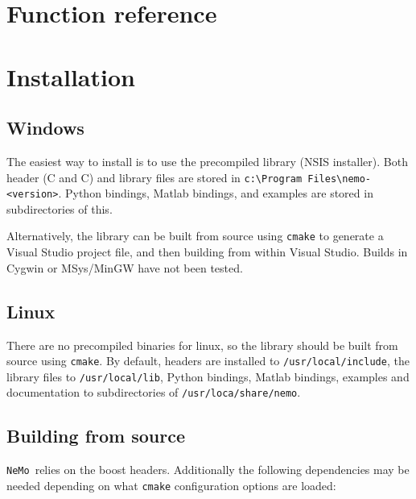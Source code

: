 \documentclass[a4paper]{article}
\newcommand{\nemo}{\texttt{NeMo}}
\newcommand{\command}[1]{\texttt{#1}}
\newcommand{\file}[1]{\texttt{#1}}
\newcommand{\directory}[1]{\texttt{#1}}
\newcommand{\cpp}{C\nolinebreak\hspace{-.05em}\raisebox{.4ex}{\tiny\bf +}\nolinebreak\hspace{-.10em}\raisebox{.4ex}{\tiny\bf +}}
\begin{document}
\newpage
\section{Function reference}
\label{fnref}



\section{Installation}

\subsection{Windows}
\label{installation:windows}

The easiest way to install is to use the precompiled library (NSIS installer).
Both header (C and \cpp) and library files are stored in \directory{c:\textbackslash Program Files\textbackslash nemo-<version>}.
Python bindings, Matlab bindings, and examples are stored in subdirectories of this.

Alternatively, the library can be built from source using \command{cmake} to generate a Visual Studio project file,
	and then building from within Visual Studio.
Builds in Cygwin or MSys/MinGW have not been tested.

\subsection{Linux}

There are no precompiled binaries for linux,
	so the library should be built from source using \command{cmake}.
By default,
	headers are installed to \file{/usr/local/include},
	the library files to \file{/usr/local/lib},
	Python bindings, Matlab bindings, examples and documentation to subdirectories of \directory{/usr/loca/share/nemo}.

\subsection{Building from source}

\nemo\ relies on the boost headers.
Additionally the following dependencies may be needed depending on what \command{cmake} configuration options are loaded: 
\end{document}
